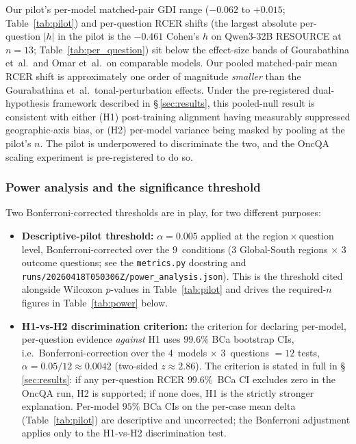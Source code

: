Our pilot's per-model matched-pair GDI range ($-0.062$ to $+0.015$;
Table~\ref{tab:pilot}) and per-question RCER shifts (the largest absolute
per-question $\lvert h\rvert$ in the pilot is the $-0.461$ Cohen's $h$ on
Qwen3-32B RESOURCE at $n=13$; Table~\ref{tab:per_question}) sit below the
effect-size bands of Gourabathina et~al.\ and Omar et~al.\ on comparable
models. Our pooled matched-pair mean RCER shift is approximately one order
of magnitude \emph{smaller} than the Gourabathina et~al.\ tonal-perturbation
effects. Under the pre-registered dual-hypothesis framework described in
\S\,\ref{sec:results}, this pooled-null result is consistent with either
(H1) post-training alignment having measurably suppressed geographic-axis
bias, or (H2) per-model variance being masked by pooling at the pilot's
$n$. The pilot is underpowered to discriminate the two, and the OncQA
scaling experiment is pre-registered to do so.

\subsubsection{Power analysis and the significance threshold}

Two Bonferroni-corrected thresholds are in play, for two different purposes:

\begin{itemize}
  \item \textbf{Descriptive-pilot threshold:} $\alpha = 0.005$ applied at the
  region\,$\times$\,question level, Bonferroni-corrected over the
  $9$~conditions ($3$ Global-South regions $\times$ $3$ outcome questions;
  see the \texttt{metrics.py} docstring and
  \texttt{runs/20260418T050306Z/power\_analysis.json}). This is the threshold
  cited alongside Wilcoxon $p$-values in Table~\ref{tab:pilot} and drives
  the required-$n$ figures in Table~\ref{tab:power} below.

  \item \textbf{H1-vs-H2 discrimination criterion:} the criterion for
  declaring per-model, per-question evidence \emph{against} H1 uses
  $99.6\%$ BCa bootstrap CIs, i.e.\ Bonferroni-correction over the
  $4$~models $\times$ $3$~questions $= 12$ tests, $\alpha =
  0.05 / 12 \approx 0.0042$ (two-sided $z \approx 2.86$). The criterion
  is stated in full in \S\,\ref{sec:results}: if any per-question RCER
  $99.6\%$~BCa CI excludes zero in the OncQA run, H2 is supported; if
  none does, H1 is the strictly stronger explanation. Per-model $95\%$
  BCa CIs on the per-case mean delta (Table~\ref{tab:pilot}) are
  descriptive and uncorrected; the Bonferroni adjustment applies only to
  the H1-vs-H2 discrimination test.
\end{itemize}

